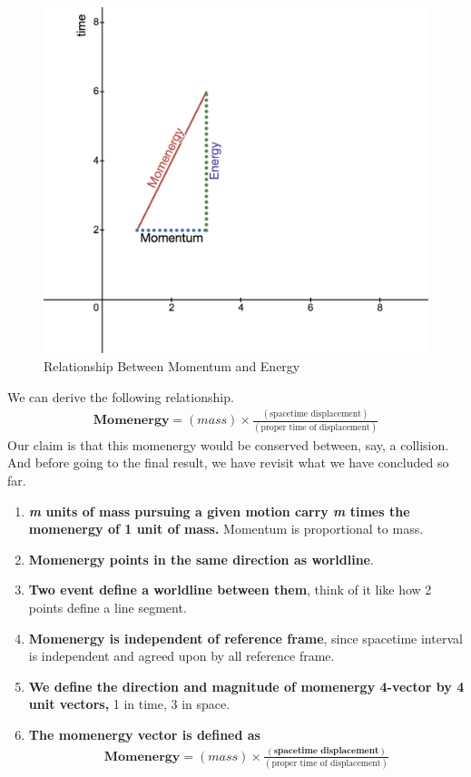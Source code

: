 \documentclass[12pt]{book}
\newcommand{\paren}[1]{\left( #1 \right)}
\begin{document}
\begin{figure}[!h]
    \centering
    \includegraphics[width=0.5\linewidth]{picture/momentum-energy.png}
    \caption{Relationship Between Momentum and Energy}
    \label{fig:enter-label}
\end{figure}
\newpage
We can derive the following relationship. 
\begin{align}
\textbf{Momenergy} = \paren{mass}\times \frac{\paren{\text{spacetime displacement}}}{\paren{\text{proper time of displacement}}}
\end{align}
Our claim is that this momenergy would be conserved between, say, a collision. And before going to the final result, we have revisit what we have concluded so far.
\begin{enumerate}
    \item \textbf{\textit{m} units of mass pursuing a given motion carry \textit{m} times the momenergy of 1 unit of mass.} Momentum is proportional to mass.
    \item \textbf{Momenergy points in the same direction as worldline}.
    \item \textbf{Two event define a worldline between them}, think of it like how 2 points define a line segment.
    \item \textbf{Momenergy is independent of reference frame}, since spacetime interval is independent and agreed upon by all reference frame.
    \item \textbf{We define the direction and magnitude of momenergy 4-vector by 4 unit vectors,} 1 in time, 3 in space. 
    \item \textbf{The momenergy vector is defined as}
    \begin{align}
\textbf{Momenergy} = \paren{mass}\times \frac{\paren{\textbf{spacetime displacement}}}{\paren{\text{proper time of displacement}}}
\end{align}
\end{enumerate}
\end{document}
